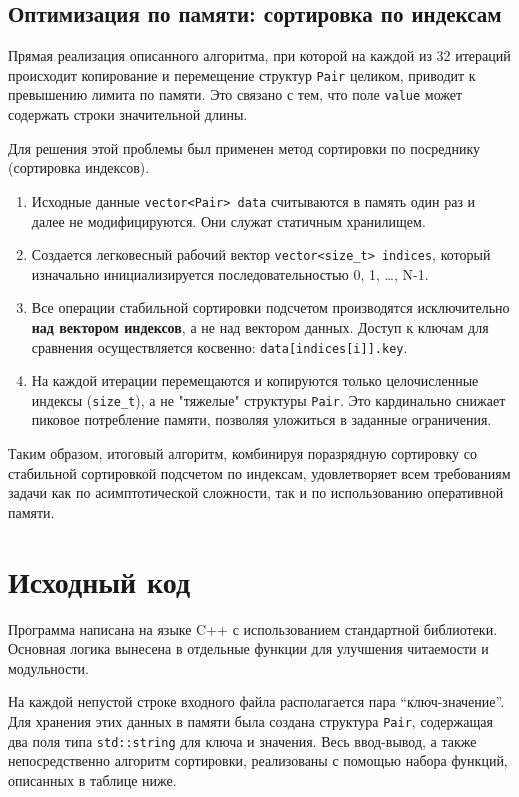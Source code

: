 \subsection{Оптимизация по памяти: сортировка по индексам}
Прямая реализация описанного алгоритма, при которой на каждой из 32 итераций происходит копирование и перемещение структур \texttt{Pair} целиком, приводит к превышению лимита по памяти. Это связано с тем, что поле \texttt{value} может содержать строки значительной длины.

Для решения этой проблемы был применен метод сортировки по посреднику (сортировка индексов).
\begin{enumerate}
    \item Исходные данные \texttt{vector<Pair> data} считываются в память один раз и далее не модифицируются. Они служат статичным хранилищем.
    \item Создается легковесный рабочий вектор \texttt{vector<size\_t> indices}, который изначально инициализируется последовательностью 0, 1, \dots, N-1.
    \item Все операции стабильной сортировки подсчетом производятся исключительно \textbf{над вектором индексов}, а не над вектором данных. Доступ к ключам для сравнения осуществляется косвенно: \texttt{data[indices[i]].key}.
    \item На каждой итерации перемещаются и копируются только целочисленные индексы (\texttt{size\_t}), а не "тяжелые" структуры \texttt{Pair}. Это кардинально снижает пиковое потребление памяти, позволяя уложиться в заданные ограничения.
\end{enumerate}

Таким образом, итоговый алгоритм, комбинируя поразрядную сортировку со стабильной сортировкой подсчетом по индексам, удовлетворяет всем требованиям задачи как по асимптотической сложности, так и по использованию оперативной памяти.

\pagebreak

\section{Исходный код}
Программа написана на языке C++ с использованием стандартной библиотеки. Основная логика вынесена в отдельные функции для улучшения читаемости и модульности.

На каждой непустой строке входного файла располагается пара \enquote{ключ-значение}. Для хранения этих данных в памяти была создана структура \texttt{Pair}, содержащая два поля типа \texttt{std::string} для ключа и значения. Весь ввод-вывод, а также непосредственно алгоритм сортировки, реализованы с помощью набора функций, описанных в таблице ниже.

